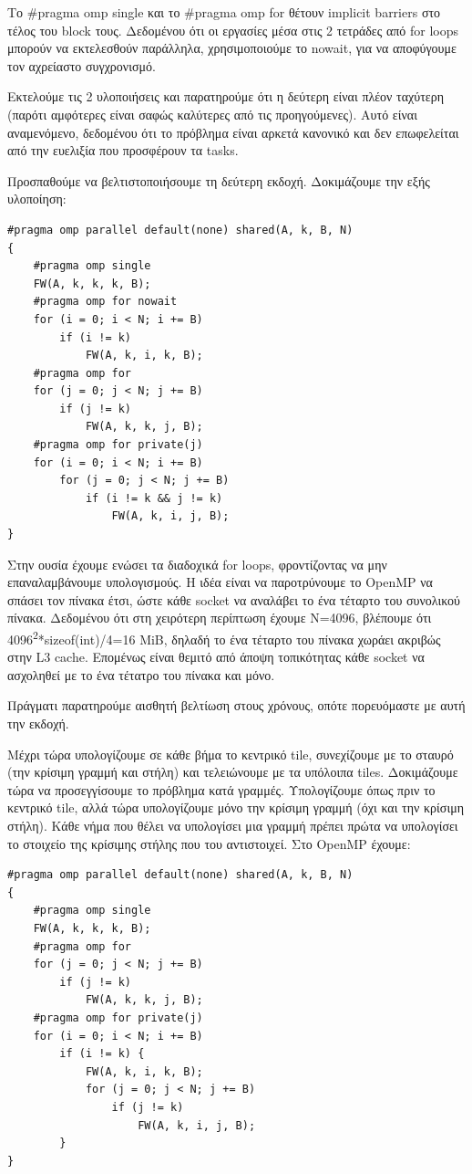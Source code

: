 \documentclass[12pt,titlepage]{article}
\begin{document}
Το \#pragma omp single και το \#pragma omp for θέτουν implicit barriers στο
τέλος του block τους. Δεδομένου ότι οι εργασίες μέσα στις 2 τετράδες από for
loops μπορούν να εκτελεσθούν παράλληλα, χρησιμοποιούμε το nowait, για να
αποφύγουμε τον αχρείαστο συγχρονισμό.

Εκτελούμε τις 2 υλοποιήσεις και παρατηρούμε ότι η δεύτερη είναι πλέον ταχύτερη
(παρότι αμφότερες είναι σαφώς καλύτερες από τις προηγούμενες). Αυτό είναι
αναμενόμενο, δεδομένου ότι το πρόβλημα είναι αρκετά κανονικό και δεν επωφελείται
από την ευελιξία που προσφέρουν τα tasks.

Προσπαθούμε να βελτιστοποιήσουμε τη δεύτερη εκδοχή. Δοκιμάζουμε την εξής
υλοποίηση:

\begin{verbatim}
#pragma omp parallel default(none) shared(A, k, B, N)
{
    #pragma omp single
    FW(A, k, k, k, B);
    #pragma omp for nowait
    for (i = 0; i < N; i += B)
        if (i != k)
            FW(A, k, i, k, B);
    #pragma omp for
    for (j = 0; j < N; j += B)
        if (j != k)
            FW(A, k, k, j, B);
    #pragma omp for private(j)
    for (i = 0; i < N; i += B)
        for (j = 0; j < N; j += B)
            if (i != k && j != k)
                FW(A, k, i, j, B);
}
\end{verbatim}

Στην ουσία έχουμε ενώσει τα διαδοχικά for loops, φροντίζοντας να μην
επαναλαμβάνουμε υπολογισμούς. Η ιδέα είναι να παροτρύνουμε το OpenMP να σπάσει
τον πίνακα έτσι, ώστε κάθε socket να αναλάβει το ένα τέταρτο του συνολικού
πίνακα. Δεδομένου ότι στη χειρότερη περίπτωση έχουμε N=4096, βλέπουμε ότι
4096\textsuperscript2*sizeof(int)/4=16 MiB, δηλαδή το ένα τέταρτο του πίνακα
χωράει ακριβώς στην L3 cache. Επομένως είναι θεμιτό από άποψη τοπικότητας κάθε
socket να ασχοληθεί με το ένα τέτατρο του πίνακα και μόνο.

Πράγματι παρατηρούμε αισθητή βελτίωση στους χρόνους, οπότε πορευόμαστε με αυτή
την εκδοχή.

Μέχρι τώρα υπολογίζουμε σε κάθε βήμα το κεντρικό tile, συνεχίζουμε με το σταυρό
(την κρίσιμη γραμμή και στήλη) και τελειώνουμε με τα υπόλοιπα tiles. Δοκιμάζουμε
τώρα να προσεγγίσουμε το πρόβλημα κατά γραμμές. Υπολογίζουμε όπως πριν το
κεντρικό tile, αλλά τώρα υπολογίζουμε μόνο την κρίσιμη γραμμή (όχι και την
κρίσιμη στήλη). Κάθε νήμα που θέλει να υπολογίσει μια γραμμή πρέπει πρώτα να
υπολογίσει το στοιχείο της κρίσιμης στήλης που του αντιστοιχεί. Στο OpenMP
έχουμε:

\begin{verbatim}
#pragma omp parallel default(none) shared(A, k, B, N)
{
    #pragma omp single
    FW(A, k, k, k, B);
    #pragma omp for
    for (j = 0; j < N; j += B)
        if (j != k)
            FW(A, k, k, j, B);
    #pragma omp for private(j)
    for (i = 0; i < N; i += B)
        if (i != k) {
            FW(A, k, i, k, B);
            for (j = 0; j < N; j += B)
                if (j != k)
                    FW(A, k, i, j, B);
        }
}
\end{verbatim}
\end{document}
